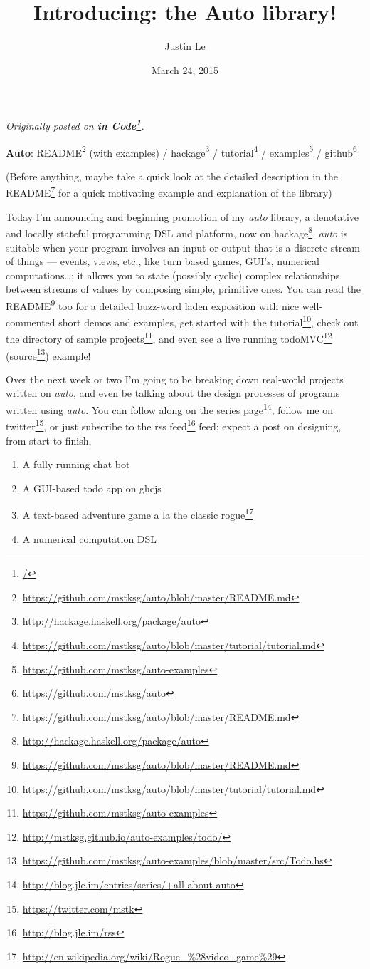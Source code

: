 \documentclass[]{article}
\title{Introducing: the Auto library!}
\author{Justin Le}
\date{March 24, 2015}
\renewcommand{\href}[2]{#2\footnote{\url{#1}}}
\begin{document}
\maketitle

\emph{Originally posted on \textbf{\href{/}{in Code}}.}

\textbf{Auto}:
\href{https://github.com/mstksg/auto/blob/master/README.md}{README}
(with examples) /
\href{http://hackage.haskell.org/package/auto}{hackage} /
\href{https://github.com/mstksg/auto/blob/master/tutorial/tutorial.md}{tutorial}
/ \href{https://github.com/mstksg/auto-examples}{examples} /
\href{https://github.com/mstksg/auto}{github}

(Before anything, maybe take a quick look at the detailed description in
the \href{https://github.com/mstksg/auto/blob/master/README.md}{README}
for a quick motivating example and explanation of the library)

Today I'm announcing and beginning promotion of my \emph{auto} library,
a denotative and locally stateful programming DSL and platform, now
\href{http://hackage.haskell.org/package/auto}{on hackage}. \emph{auto}
is suitable when your program involves an input or output that is a
discrete stream of things --- events, views, etc., like turn based
games, GUI's, numerical computations\ldots{}; it allows you to state
(possibly cyclic) complex relationships between streams of values by
composing simple, primitive ones. You can read the
\href{https://github.com/mstksg/auto/blob/master/README.md}{README} too
for a detailed buzz-word laden exposition with nice well-commented short
demos and examples, get started with
\href{https://github.com/mstksg/auto/blob/master/tutorial/tutorial.md}{the
tutorial}, check out the directory of
\href{https://github.com/mstksg/auto-examples}{sample projects}, and
even see a live running
\href{http://mstksg.github.io/auto-examples/todo/}{todoMVC}
(\href{https://github.com/mstksg/auto-examples/blob/master/src/Todo.hs}{source})
example!

Over the next week or two I'm going to be breaking down real-world
projects written on \emph{auto}, and even be talking about the design
processes of programs written using \emph{auto}. You can follow along on
\href{http://blog.jle.im/entries/series/+all-about-auto}{the series
page}, follow me on \href{https://twitter.com/mstk}{twitter}, or just
subscribe to the \href{http://blog.jle.im/rss}{rss feed} feed; expect a
post on designing, from start to finish,

\begin{enumerate}
\def\labelenumi{\arabic{enumi}.}
\tightlist
\item
  A fully running chat bot
\item
  A GUI-based todo app on ghcjs
\item
  A text-based adventure game a la the classic
  \href{http://en.wikipedia.org/wiki/Rogue_\%28video_game\%29}{rogue}
\item
  A numerical computation DSL
\end{enumerate}
\end{document}
